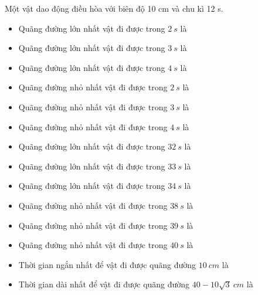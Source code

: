 
\begin{vidu}%
Một vật dao động điều hòa với biên độ 10 cm và chu kì 12 s.
\begin{itemize}
\item[1.] Quãng đường lớn nhất vật đi được trong $2\ s$ là \dotfill
\item[2.] Quãng đường lớn nhất vật đi được trong $3\ s$ là \dotfill
\item[3.] Quãng đường lớn nhất vật đi được trong $4\ s$ là \dotfill
\item[4.] Quãng đường nhỏ nhất vật đi được trong $2\ s$ là \dotfill
\item[5.] Quãng đường nhỏ nhất vật đi được trong $3\ s$ là \dotfill
\item[6.] Quãng đường nhỏ nhất vật đi được trong $4\ s$ là \dotfill
\item[7.] Quãng đường lớn nhất vật đi được trong $32\ s$ là\dotfill
\item[8.] Quãng đường lớn nhất vật đi được trong $33\ s$ là \dotfill
\item[9.] Quãng đường lớn nhất vật đi được trong $34\ s$ là \dotfill
\item[10.] Quãng đường nhỏ nhất vật đi được trong $38\ s$ là \dotfill
\item[11.] Quãng đường nhỏ nhất vật đi được trong $39\ s$ là \dotfill
\item[12.] Quãng đường nhỏ nhất vật đi được trong $40\ s$ là \dotfill
\item[13.] Thời gian ngắn nhất để vật đi được quãng đường $10\ cm$ là \dotfill
\item[14.] Thời gian dài nhất để vật đi được quãng đường $40-10\sqrt{3}\ cm$ là \dotfill
\end{itemize}
\end{vidu}
